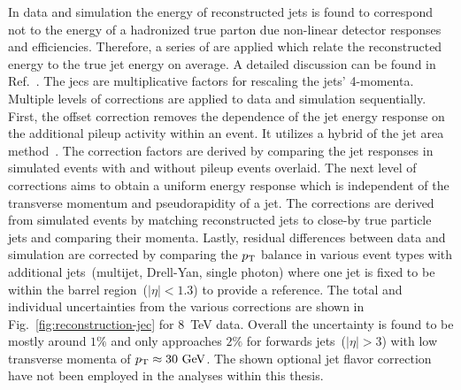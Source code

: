 In data and simulation the energy of reconstructed jets is found to correspond not to the energy of a hadronized true parton due non-linear detector responses and efficiencies. Therefore, a series of  are applied which relate the reconstructed energy to the true jet energy on average. A detailed discussion can be found in Ref.~\cite{Khachatryan:2016kdb}. The \glspl{jec} are multiplicative factors for rescaling the jets' 4-momenta. Multiple levels of corrections are applied to data and simulation sequentially. First, the offset correction removes the dependence of the jet energy response on the additional pileup activity within an event. It utilizes a hybrid of the jet area method~\cite{Cacciari:2007fd}. The correction factors are derived by comparing the jet responses in simulated events with and without pileup events overlaid. The next level of corrections aims to obtain a uniform energy response which is independent of the transverse momentum and pseudorapidity of a jet. The corrections are derived from simulated events by matching reconstructed jets to close-by true particle jets and comparing their momenta. Lastly, residual differences between data and simulation are corrected by comparing the $p_\mathrm{T}$ balance in various  event types with additional jets~(multijet, Drell-Yan, single photon) where one jet is fixed to be within the barrel region~($|\eta|<1.3$) to provide a reference. The total and individual uncertainties from the various corrections are shown in Fig.~\ref{fig:reconstruction-jec} for 8~TeV data. Overall the uncertainty is found to be mostly around $1\%$ and only approaches $2\%$ for forwards jets~($|\eta|>3$) with low transverse momenta of $p_\mathrm{T}\approx30~\mathrm{GeV}$. The shown optional jet flavor correction have not been employed in the analyses within this thesis.

